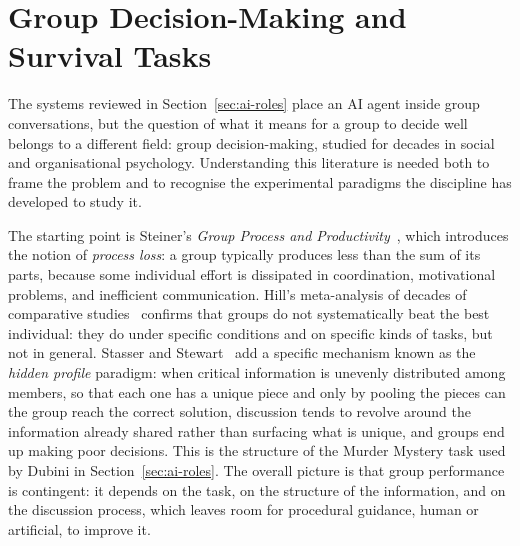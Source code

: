 
\section{Group Decision-Making and Survival Tasks}
\label{sec:group-decision-making}

The systems reviewed in Section~\ref{sec:ai-roles} place an AI agent inside group conversations, but the question of what it means for a group to decide well belongs to a different field: group decision-making, studied for decades in social and organisational psychology. Understanding this literature is needed both to frame the problem and to recognise the experimental paradigms the discipline has developed to study it.

The starting point is Steiner's \emph{Group Process and Productivity}~\cite{steiner1972group}, which introduces the notion of \emph{process loss}: a group typically produces less than the sum of its parts, because some individual effort is dissipated in coordination, motivational problems, and inefficient communication. Hill's meta-analysis of decades of comparative studies~\cite{hill1982group} confirms that groups do not systematically beat the best individual: they do under specific conditions and on specific kinds of tasks, but not in general. Stasser and Stewart~\cite{stasser1992hidden} add a specific mechanism known as the \emph{hidden profile} paradigm: when critical information is unevenly distributed among members, so that each one has a unique piece and only by pooling the pieces can the group reach the correct solution, discussion tends to revolve around the information already shared rather than surfacing what is unique, and groups end up making poor decisions. This is the structure of the Murder Mystery task used by Dubini in Section~\ref{sec:ai-roles}. The overall picture is that group performance is contingent: it depends on the task, on the structure of the information, and on the discussion process, which leaves room for procedural guidance, human or artificial, to improve it.

